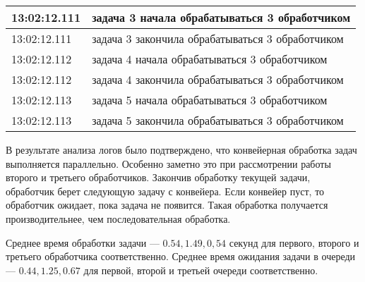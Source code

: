 \begin{table}[h]
\begin{center}
\begin{threeparttable}
\begin{tabular}{|l|l|}
                         13:02:12.111  & задача 3 начала обрабатываться 3 обработчиком\\
                                                 \hline

                         13:02:12.111  & задача 3 закончила обрабатываться 3 обработчиком \\
                                                 \hline

                         13:02:12.112  & задача 4 начала обрабатываться 3 обработчиком \\
                                                 \hline

                         13:02:12.112  & задача 4 закончила обрабатываться 3 обработчиком \\
                                                 \hline

                         13:02:12.113  & задача 5 начала обрабатываться 3 обработчиком \\
                                                 \hline

                         13:02:12.113  & задача 5 закончила обрабатываться 3 обработчиком \\
                                                 \hline


                        \hline
                    \end{tabular}
		\end{threeparttable}
    \end{center}
\end{table}


\clearpage
В результате анализа логов было подтверждено, что конвейерная обработка задач выполняется параллельно. Особенно заметно это при рассмотрении работы второго и третьего обработчиков. Закончив обработку текущей задачи, обработчик берет следующую задачу с конвейера. Если конвейер пуст, то обработчик ожидает, пока задача не появится. Такая обработка получается производительнее, чем последовательная обработка.

Среднее время обработки задачи --- $0.54, 1.49, 0,54$ секунд для первого, второго и третьего обработчика соответственно.
Среднее время ожидания задачи в очереди --- $0.44, 1.25, 0.67$ для первой, второй и третьей очереди соответственно.

\clearpage



